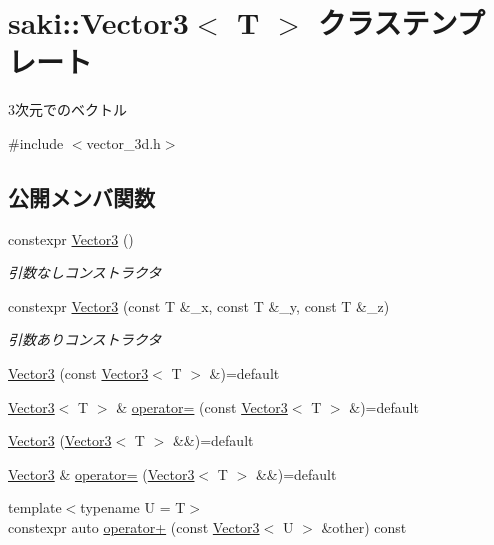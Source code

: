 \hypertarget{classsaki_1_1_vector3}{}\section{saki\+:\+:Vector3$<$ T $>$ クラステンプレート}
\label{classsaki_1_1_vector3}


3次元でのベクトル  




{\ttfamily \#include $<$vector\+\_\+3d.\+h$>$}

\subsection*{公開メンバ関数}
\begin{DoxyCompactItemize}
\item 
constexpr \mbox{\hyperlink{classsaki_1_1_vector3_a8617fe1a8d279c9673628728a0c5e5c6}{Vector3}} ()
\begin{DoxyCompactList}\small\item\em 引数なしコンストラクタ \end{DoxyCompactList}\item 
constexpr \mbox{\hyperlink{classsaki_1_1_vector3_abaf9038ebdc4895d7df1319b6234d790}{Vector3}} (const T \&\+\_\+x, const T \&\+\_\+y, const T \&\+\_\+z)
\begin{DoxyCompactList}\small\item\em 引数ありコンストラクタ \end{DoxyCompactList}\item 
\mbox{\hyperlink{classsaki_1_1_vector3_ae996c120efb16029f71c26e24dfaa144}{Vector3}} (const \mbox{\hyperlink{classsaki_1_1_vector3}{Vector3}}$<$ T $>$ \&)=default
\item 
\mbox{\hyperlink{classsaki_1_1_vector3}{Vector3}}$<$ T $>$ \& \mbox{\hyperlink{classsaki_1_1_vector3_ac007820dba4edbbc1ee4cc030bc181a7}{operator=}} (const \mbox{\hyperlink{classsaki_1_1_vector3}{Vector3}}$<$ T $>$ \&)=default
\item 
\mbox{\hyperlink{classsaki_1_1_vector3_abc134b06c0498adbcc87455a0e14e786}{Vector3}} (\mbox{\hyperlink{classsaki_1_1_vector3}{Vector3}}$<$ T $>$ \&\&)=default
\item 
\mbox{\hyperlink{classsaki_1_1_vector3}{Vector3}} \& \mbox{\hyperlink{classsaki_1_1_vector3_a3e7f3b5c50c73cc0915a26da2b64dbc4}{operator=}} (\mbox{\hyperlink{classsaki_1_1_vector3}{Vector3}}$<$ T $>$ \&\&)=default
\item 
{\footnotesize template$<$typename U  = T$>$ }\\constexpr auto \mbox{\hyperlink{classsaki_1_1_vector3_abd44b15228ed5ac36726acf4952b220e}{operator+}} (const \mbox{\hyperlink{classsaki_1_1_vector3}{Vector3}}$<$ U $>$ \&other) const

\end{DoxyCompactItemize}
